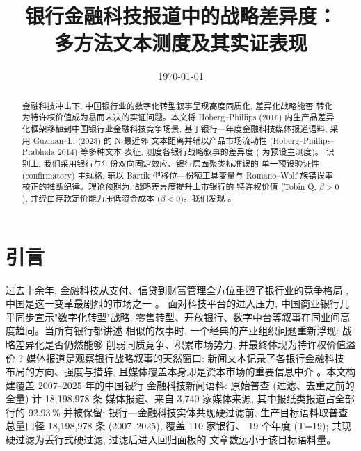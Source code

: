 




\title{银行金融科技报道中的战略差异度：\\多方法文本测度及其实证表现}
\author{}
\date{\today}


\maketitle

\begin{abstract}
金融科技冲击下, 中国银行业的数字化转型叙事呈现高度同质化, 差异化战略能否
转化为特许权价值成为悬而未决的实证问题。本文将
Hoberg--Phillips (2016) 内生产品差异化框架移植到中国银行业金融科技竞争场景,
基于银行—年度金融科技媒体报道语料, 采用 Guzman--Li (2023) 的 N-最近邻
文本距离并辅以产品市场流动性 (Hoberg--Phillips--Prabhala 2014) 等多种文本
表征, 测度各银行战略叙事的差异度 ( 为预设主测度)。
识别上, 我们采用银行与年份双向固定效应、银行层面聚类标准误的
单一预设验证性 (confirmatory) 主规格, 辅以 Bartik 型移位—份额工具变量与
Romano--Wolf 族错误率校正的推断纪律。理论预期为: 战略差异度提升上市银行的
特许权价值 (Tobin Q, $\beta>0$), 并经由存款定价能力压低资金成本
($\beta<0$)。我们发现 \@。
\end{abstract}

\section{引言}\label{sec:intro}

过去十余年, 金融科技从支付、信贷到财富管理全方位重塑了银行业的竞争格局
\parencite{berg2022fintechlending,parlour2022payments,vives2025lendercompetition},
中国是这一变革最剧烈的市场之一 \parencite{hau2024fintechcredit,cheng2020bankfintech}。
面对科技平台的进入压力, 中国商业银行几乎同步宣示"数字化转型"战略,
零售转型、开放银行、数字中台等叙事在同业间高度趋同。当所有银行都讲述
相似的故事时, 一个经典的产业组织问题重新浮现: 战略差异化是否仍然能够
削弱同质竞争、积累市场势力, 并最终体现为特许权价值溢价
\parencite{hoberg2016tnic,drechsler2026franchise}?
媒体报道是观察银行战略叙事的天然窗口: 新闻文本记录了各银行金融科技
布局的方向、强度与措辞, 且媒体覆盖本身即是资本市场的重要信息中介
\parencite{fang2009media,you2018pen}。本文构建覆盖 2007--2025 年的中国银行
金融科技新闻语料: 原始普查 (过滤、去重之前的全量) 计 18{,}198{,}978 条
媒体报道、来自 3{,}740 家媒体来源, 其中报纸类报道占全部行的 92.93\,\%
并被保留; 银行—金融科技实体共现硬过滤前, 生产目标语料取普查
总量口径 18{,}198{,}978 条 (2007--2025), 覆盖 110 家银行、
19 个年度 (T=19); 共现硬过滤为丢行式硬过滤, 过滤后进入回归面板的
文章数远小于该目标语料量。

